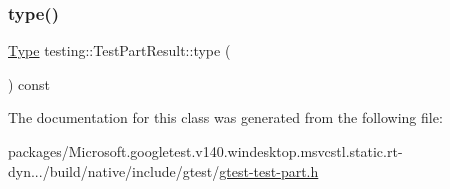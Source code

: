 \mbox{\label{classtesting_1_1_test_part_result_aab92b225e8a472e78bd3889ca6df0d2a}} 
\subsubsection{\texorpdfstring{type()}{type()}}
{\footnotesize\ttfamily \mbox{\hyperlink{classtesting_1_1_test_part_result_a65ae656b33fdfdfffaf34858778a52d5}{Type}} testing\+::\+Test\+Part\+Result\+::type (\begin{DoxyParamCaption}{ }\end{DoxyParamCaption}) const\hspace{0.3cm}{\ttfamily [inline]}}



The documentation for this class was generated from the following file\+:\begin{DoxyCompactItemize}
\item 
packages/\+Microsoft.\+googletest.\+v140.\+windesktop.\+msvcstl.\+static.\+rt-\/dyn.../build/native/include/gtest/\mbox{\hyperlink{gtest-test-part_8h}{gtest-\/test-\/part.\+h}}\end{DoxyCompactItemize}
